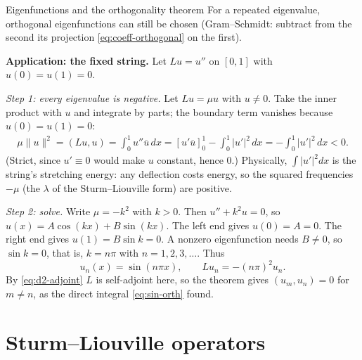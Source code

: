 \documentclass[11pt]{beamer}
\begin{document}
\begin{frame}[allowframebreaks=1.00]{Eigenfunctions and the orthogonality theorem}
For a repeated eigenvalue, orthogonal eigenfunctions can still be chosen
(Gram--Schmidt: subtract from the second its projection \eqref{eq:coeff-orthogonal}
on the first).



\textbf{Application: the fixed string.} Let \(Lu=u''\) on \([0,1]\) with \(u(0)=u(1)=0\).

\emph{Step 1: every eigenvalue is negative.} Let \(Lu=\mu u\) with \(u\neq0\). Take the inner product with \(u\)
and integrate by parts; the boundary term vanishes because \(u(0)=u(1)=0\):
\begin{align*}
  \mu\|u\|^2
   =(Lu,u)
   =\int_0^1u''\overline u\,dx
   =\left[u'\overline u\right]_0^1-\int_0^1|u'|^2\,dx
   =-\int_0^1|u'|^2\,dx<0.
\end{align*}
(Strict, since $u'\equiv0$ would make $u$ constant, hence $0$.)  Physically,
$\int|u'|^2dx$ is the string's stretching energy: any deflection costs energy, so
the squared frequencies $-\mu$ (the $\lambda$ of the Sturm--Liouville form) are positive.

\emph{Step 2: solve.} Write \(\mu=-k^2\) with \(k>0\). Then \(u''+k^2u=0\), so
\(u(x)=A\cos(kx)+B\sin(kx)\). The left end gives \(u(0)=A=0\). The right end gives \(u(1)=B\sin k=0\). A
nonzero eigenfunction needs \(B\neq0\), so \(\sin k=0\), that is, \(k=n\pi\) with \(n=1,2,3,\ldots\). Thus
\begin{equation}
  u_n(x)=\sin(n\pi x),
  \qquad
  Lu_n=-(n\pi)^2u_n.
  \label{eq:string-eigenpairs}
\end{equation}
By \eqref{eq:d2-adjoint} $L$ is self-adjoint here, so the theorem gives
$(u_m,u_n)=0$ for $m\neq n$, as the direct integral \eqref{eq:sin-orth} found.
\end{frame}

\section{Sturm--Liouville operators}
\label{sec:sturm-liouville}
\end{document}
